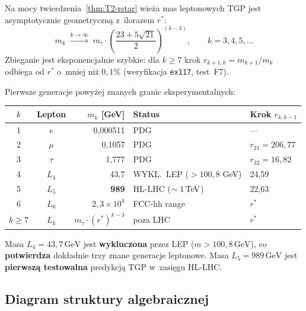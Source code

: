 \begin{proposition}\label{prop:T2-tower}
Na mocy twierdzenia~\ref{thm:T2-rstar} wie\.za mas leptonowych TGP
jest asymptotycznie geometryczn\k{a} z~ilorazem $r^*$:
\begin{equation}\label{eq:T2-tower}
  m_k \;\xrightarrow{k\to\infty}\;
  m_\tau \cdot \left(\frac{23+5\sqrt{21}}{2}\right)^{\!\!(k-3)},
  \qquad k = 3, 4, 5, \ldots
\end{equation}
Zbieganie jest eksponencjalnie szybkie:
dla $k \geq 7$ krok $r_{k+1,k} = m_{k+1}/m_k$ odbiega
od $r^*$ o~mniej ni\.z $0{,}1\%$ (weryfikacja \texttt{ex117}, test~F7).

Pierwsze generacje powyżej znanych granic eksperymentalnych:
\begin{center}\small
\begin{tabular}{@{}ccrll@{}}
\toprule
$k$ & Lepton & $m_k$ [GeV] & Status & Krok $r_{k,k-1}$ \\
\midrule
1 & $e$     & 0{,}000511  & PDG  & --- \\
2 & $\mu$   & 0{,}1057    & PDG  & $r_{21}=206{,}77$ \\
3 & $\tau$  & 1{,}777     & PDG  & $r_{32}=16{,}82$ \\
4 & $L_4$   & 43{,}7      & WYKL.\ LEP ($>100{,}8$ GeV) & 24{,}59 \\
5 & $L_5$   & \textbf{989} & HL-LHC ($\sim 1\,{\rm TeV}$) & 22{,}63 \\
6 & $L_6$   & $2{,}3 \times 10^4$ & FCC-hh range & $r^*$ \\
$k\geq7$ & $L_k$ & $m_\tau\cdot(r^*)^{k-3}$ & poza LHC & $r^*$ \\
\bottomrule
\end{tabular}
\end{center}

Masa $L_4 = 43{,}7\,\mathrm{GeV}$ jest \textbf{wykluczona} przez LEP
($m > 100{,}8\,\mathrm{GeV}$), co \textbf{potwierdza} dok\l{}adnie
trzy znane generacje leptonowe.
Masa $L_5 = 989\,\mathrm{GeV}$ jest \textbf{pierwsz\k{a} testowalna}
predykcj\k{a} TGP w~zasięgu HL-LHC.
\end{proposition}


\subsection{Diagram struktury algebraicznej}\label{app:T2-diagram}

